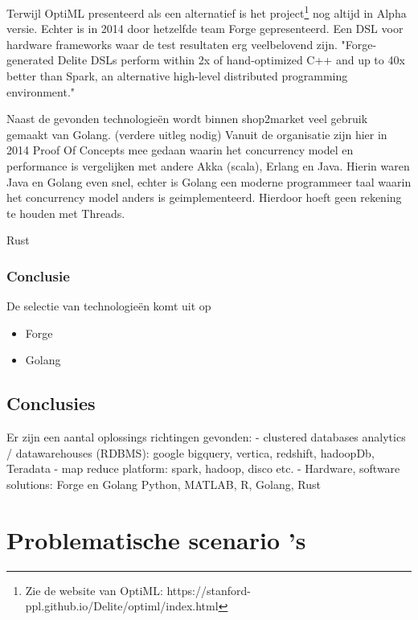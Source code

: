Terwijl \cite{sujeeth2011optiml} OptiML presenteerd als een alternatief is het project\footnote{Zie de website van OptiML: https://stanford-ppl.github.io/Delite/optiml/index.html} nog altijd in Alpha versie. Echter is in 2014 door hetzelfde team Forge gepresenteerd. Een DSL voor hardware frameworks waar de test resultaten erg veelbelovend zijn. "Forge-generated Delite DSLs perform within 2x of hand-optimized C++ and up to 40x better than Spark, an alternative high-level distributed programming environment." \parencite{sujeeth2014forge}


Naast de gevonden technologieën wordt binnen shop2market veel gebruik gemaakt van Golang. (verdere uitleg nodig)
Vanuit de organisatie zijn hier in 2014 Proof Of Concepts mee gedaan waarin het concurrency model en performance is vergelijken met andere Akka (scala), Erlang en Java. Hierin waren Java en Golang even snel, echter is Golang een moderne programmeer taal waarin het concurrency model anders is geimplementeerd. Hierdoor hoeft geen rekening te houden met Threads.

Rust

\subsubsection{Conclusie}

De selectie van technologieën komt uit op

\begin{itemize}
    \item Forge
    \item Golang
\end{itemize}


\subsection{Conclusies}

Er zijn een aantal oplossings richtingen gevonden:
- clustered databases analytics / datawarehouses (RDBMS): google bigquery, vertica, redshift, hadoopDb, Teradata
- map reduce platform: spark, hadoop, disco etc.
- Hardware, software solutions: Forge en Golang Python, MATLAB, R, Golang, Rust


\clearpage

\section{Problematische scenario 's}
\label{sec:deelvraag3}

